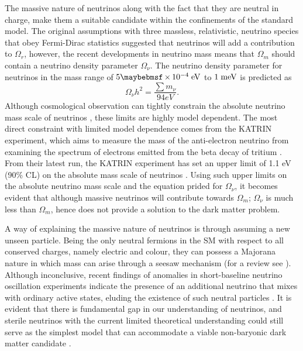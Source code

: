 The massive nature of neutrinos along with the fact that they are neutral in charge, make them a suitable candidate within the confinements of the standard model. The original assumptions with three massless, relativistic, neutrino species that obey Fermi-Dirac statistics suggested that neutrinos will add a contribution to $\Omega_{r}$, however, the recent developments in neutrino mass means that $\Omega_{m}$ should contain a neutrino density parameter $\Omega_{\nu}$. The neutrino density parameter for neutrinos in the mass range of $5 \times 10^{-4} \; \MathText{eV}$ to $1 \; \text{meV}$ is predicted as \cite{Jungman_1996}
%
\begin{equation}
    \Omega_{\nu}h^{2} = \frac{\sum{m_\nu}}{94eV}.
\end{equation}
%
Although cosmological observation can tightly constrain the absolute neutrino mass scale of neutrinos \cite{Lesgourgues_2012}, these limits are highly model dependent. The most direct constraint with limited model dependence comes from the KATRIN experiment, which aims to measure the mass of the anti-electron neutrino from examining the spectrum of electrons emitted from the beta decay of tritium \cite{katrin_experiment}. From their latest run, the KATRIN experiment has set an upper limit of 1.1 eV (90\% CL) on the absolute mass scale of neutrinos \cite{katrin_results}. Using such upper limits on the absolute neutrino mass scale and the equation prided for $\Omega_{\nu}$, it becomes evident that although massive neutrinos will contribute towards $\Omega_{m}$; $\Omega_{\nu}$ is much less than $\Omega_{m}$, hence does not provide a solution to the dark matter problem.

A way of explaining the massive nature of neutrinos is through assuming a new unseen particle. Being the only neutral fermions in the SM with respect to all conserved charges, namely electric and colour, they can possess a Majorana nature in which mass can arise through a seesaw mechanism (for a review see \cite{King_2003}). Although inconclusive, recent findings of anomalies in short-baseline neutrino oscillation experiments indicate the presence of an additional neutrino that mixes with ordinary active states, eluding the existence of such neutral particles \cite{Gariazzo_2015, Aguilar_Arevalo_2018}. It is evident that there is fundamental gap in our understanding of neutrinos, and sterile neutrinos with the current limited theoretical understanding could still serve as the simplest model that can accommodate a viable non-baryonic dark matter candidate \cite{Dodelson_1994}.



